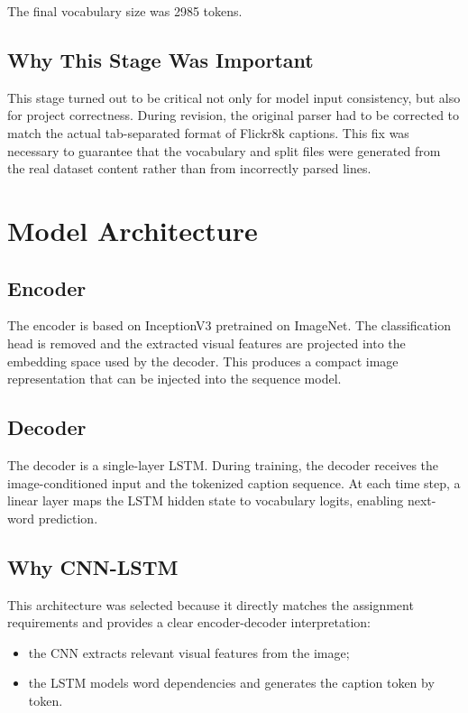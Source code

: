 \documentclass[11pt,a4paper]{article}
\begin{document}
The final vocabulary size was 2985 tokens.

\subsection{Why This Stage Was Important}

This stage turned out to be critical not only for model input consistency, but also for project correctness. During revision, the original parser had to be corrected to match the actual tab-separated format of Flickr8k captions. This fix was necessary to guarantee that the vocabulary and split files were generated from the real dataset content rather than from incorrectly parsed lines.

\section{Model Architecture}

\subsection{Encoder}

The encoder is based on InceptionV3 pretrained on ImageNet. The classification head is removed and the extracted visual features are projected into the embedding space used by the decoder. This produces a compact image representation that can be injected into the sequence model.

\subsection{Decoder}

The decoder is a single-layer LSTM. During training, the decoder receives the image-conditioned input and the tokenized caption sequence. At each time step, a linear layer maps the LSTM hidden state to vocabulary logits, enabling next-word prediction.

\subsection{Why CNN-LSTM}

This architecture was selected because it directly matches the assignment requirements and provides a clear encoder-decoder interpretation:
\begin{itemize}[leftmargin=*]
    \item the CNN extracts relevant visual features from the image;
    \item the LSTM models word dependencies and generates the caption token by token.
\end{itemize}
\end{document}

